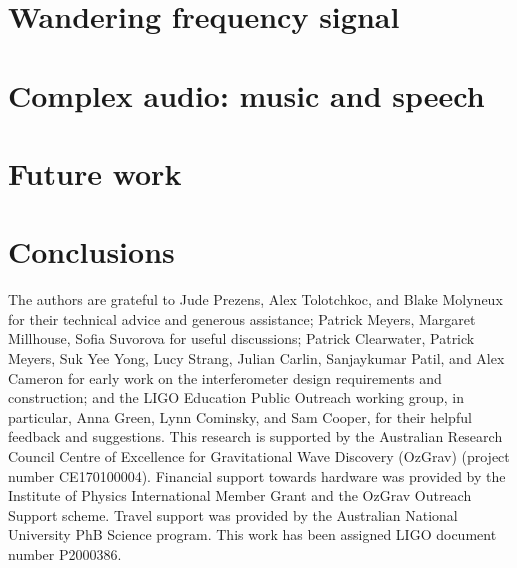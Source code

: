 \documentclass[aps,pra,superscriptaddress,reprint]{revtex4-1}
\begin{document}
 
\section{Wandering frequency signal}
\label{sec:viterbi_wandering}



\section{Complex audio: music and speech}
\label{sec:optical_microphone}



\section{Future work}
\label{sec:future_work}



\section{Conclusions}
\label{sec:conclusions}






\begin{acknowledgments}


The authors are grateful to Jude Prezens, Alex Tolotchkoc, and Blake Molyneux for their technical advice and generous assistance; Patrick Meyers, Margaret Millhouse, Sofia Suvorova for useful discussions; Patrick Clearwater, Patrick Meyers, Suk Yee Yong, Lucy Strang, Julian Carlin, Sanjaykumar Patil, and Alex Cameron for early work on the interferometer design requirements and construction; and the LIGO Education Public Outreach working group, in particular, Anna Green, Lynn Cominsky, and Sam Cooper, for their helpful feedback and suggestions.  
This research is supported by the Australian Research Council Centre of Excellence for Gravitational Wave Discovery (OzGrav) (project number CE170100004). 
Financial support towards hardware was provided by the Institute of Physics International Member Grant and the OzGrav Outreach Support scheme. 
Travel support was provided by the Australian National University PhB Science program.
This work has been assigned LIGO document number P2000386.


\end{acknowledgments}


\appendix





\end{document}
